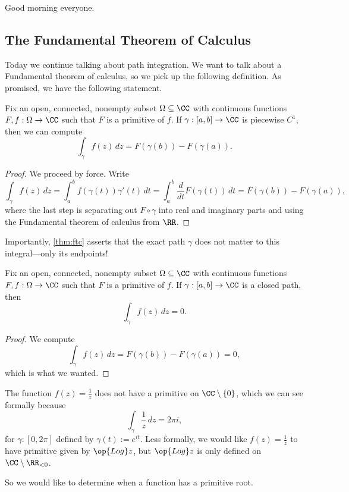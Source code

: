 
Good morning everyone.

\subsection{The Fundamental Theorem of Calculus}
Today we continue talking about path integration. We want to talk about a Fundamental theorem of calculus, so we pick up the following definition.
\primitivedef*
\noindent As promised, we have the following statement.
\begin{theorem} \label{thm:ftc}
	Fix an open, connected, nonempty subset $\Omega\subseteq\CC$ with continuous functions $F,f:\Omega\to\CC$ such that $F$ is a primitive of $f$. If $\gamma:[a,b]\to\CC$ is piecewise $C^1$, then we can compute
	\[\int_\gamma f(z)\,dz=F(\gamma(b))-F(\gamma(a)).\]
\end{theorem}
\begin{proof}
	We proceed by force. Write
	\[\int_\gamma f(z)\,dz=\int_a^b f(\gamma(t))\gamma'(t)\,dt=\int_a^b\frac d{dt}F(\gamma(t))\,dt=F(\gamma(b))-F(\gamma(a)),\]
	where the last step is separating out $F\circ\gamma$ into real and imaginary parts and using the Fundamental theorem of calculus from $\RR$.
\end{proof}
\begin{remark}
	Importantly, \autoref{thm:ftc} asserts that the exact path $\gamma$ does not matter to this integral---only its endpoints!
\end{remark}
\begin{corollary}
	Fix an open, connected, nonempty subset $\Omega\subseteq\CC$ with continuous functions $F,f:\Omega\to\CC$ such that $F$ is a primitive of $f$. If $\gamma:[a,b]\to\CC$ is a closed path, then
	\[\int_\gamma f(z)\,dz=0.\]
\end{corollary}
\begin{proof}
	We compute
	\[\int_\gamma f(z)\,dz=F(\gamma(b))-F(\gamma(a))=0,\]
	which is what we wanted.
\end{proof}
\begin{example}
	The function $f(z)=\frac1z$ does not have a primitive on $\CC\setminus\{0\}$, which we can see formally because
	\[\int_\gamma\frac1z\,dz=2\pi i,\]
	for $\gamma:[0,2\pi]$ defined by $\gamma(t):=e^{it}$. Less formally, we would like $f(z)=\frac1z$ to have primitive given by $\op{Log}z$, but $\op{Log}z$ is only defined on $\CC\setminus\RR_{<0}$.
\end{example}
So we would like to determine when a function has a primitive root.

